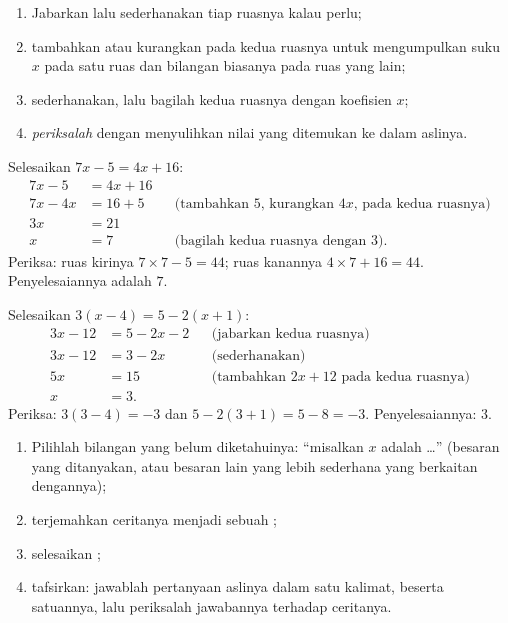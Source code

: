 \begin{method}\label{met:g8:equations:solve}
\begin{enumerate}
  \item Jabarkan lalu sederhanakan tiap ruasnya kalau perlu;
  \item tambahkan atau kurangkan pada kedua ruasnya untuk
        mengumpulkan suku $x$ pada satu ruas dan bilangan biasanya
        pada ruas yang lain;
  \item sederhanakan, lalu bagilah kedua ruasnya dengan koefisien
        $x$;
  \item \emph{periksalah} dengan menyulihkan nilai yang ditemukan ke
        dalam  aslinya.
\end{enumerate}
\end{method}

\begin{example}\label{ex:g8:equations:solve}
Selesaikan $7x - 5 = 4x + 16$:
\begin{align*}
7x - 5 &= 4x + 16 \\
7x - 4x &= 16 + 5
&& \text{(tambahkan $5$, kurangkan $4x$, pada kedua ruasnya)} \\
3x &= 21 \\
x &= 7 && \text{(bagilah kedua ruasnya dengan 3).}
\end{align*}
Periksa: ruas kirinya $7 \times 7 - 5 = 44$; ruas kanannya
$4 \times 7 + 16 = 44$. Penyelesaiannya adalah $7$.
\end{example}

\begin{example}\label{ex:g8:equations:brackets}
Selesaikan $3(x - 4) = 5 - 2(x + 1)$:
\begin{align*}
3x - 12 &= 5 - 2x - 2 && \text{(jabarkan kedua ruasnya)} \\
3x - 12 &= 3 - 2x && \text{(sederhanakan)} \\
5x &= 15 && \text{(tambahkan $2x + 12$ pada kedua ruasnya)} \\
x &= 3 .
\end{align*}
Periksa: $3(3 - 4) = -3$ dan $5 - 2(3+1) = 5 - 8 = -3$. \quad
Penyelesaiannya: $3$.
\end{example}

\begin{method}\label{met:g8:equations:problem}
\begin{enumerate}
  \item Pilihlah bilangan yang belum diketahuinya: ``misalkan $x$
        adalah \dots'' (besaran yang ditanyakan, atau besaran lain
        yang lebih sederhana yang berkaitan dengannya);
  \item terjemahkan ceritanya menjadi sebuah ;
  \item selesaikan ;
  \item tafsirkan: jawablah pertanyaan aslinya dalam satu kalimat,
        beserta satuannya, lalu periksalah jawabannya terhadap
        ceritanya.
\end{enumerate}
\end{method}

